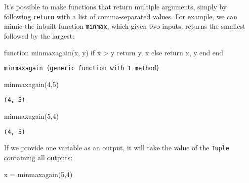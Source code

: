 \documentclass[
  letterpaper,
  DIV=11,
  numbers=noendperiod]{scrreprt}
\newenvironment{Shaded}{\begin{snugshade}}{\end{snugshade}}
\newcommand{\ControlFlowTok}[1]{\textcolor[rgb]{0.00,0.23,0.31}{#1}}
\newcommand{\FloatTok}[1]{\textcolor[rgb]{0.68,0.00,0.00}{#1}}
\newcommand{\FunctionTok}[1]{\textcolor[rgb]{0.28,0.35,0.67}{#1}}
\newcommand{\KeywordTok}[1]{\textcolor[rgb]{0.00,0.23,0.31}{#1}}
\newcommand{\NormalTok}[1]{\textcolor[rgb]{0.00,0.23,0.31}{#1}}
\newcommand{\OperatorTok}[1]{\textcolor[rgb]{0.37,0.37,0.37}{#1}}
\begin{document}
It's possible to make functions that return multiple arguments, simply
by following \texttt{return} with a list of comma-separated values. For
example, we can mimic the inbuilt function \texttt{minmax}, which given
two inputs, returns the smallest followed by the largest:

\begin{Shaded}
\begin{Highlighting}[]
\KeywordTok{function} \FunctionTok{minmaxagain}\NormalTok{(x, y)}
    \ControlFlowTok{if}\NormalTok{ x }\OperatorTok{\textgreater{}}\NormalTok{ y}
        \ControlFlowTok{return}\NormalTok{ y, x}
    \ControlFlowTok{else}
        \ControlFlowTok{return}\NormalTok{ x, y}
    \ControlFlowTok{end}
\KeywordTok{end}
\end{Highlighting}
\end{Shaded}

\begin{verbatim}
minmaxagain (generic function with 1 method)
\end{verbatim}

\begin{Shaded}
\begin{Highlighting}[]
\FunctionTok{minmaxagain}\NormalTok{(}\FloatTok{4}\NormalTok{,}\FloatTok{5}\NormalTok{)}
\end{Highlighting}
\end{Shaded}

\begin{verbatim}
(4, 5)
\end{verbatim}

\begin{Shaded}
\begin{Highlighting}[]
\FunctionTok{minmaxagain}\NormalTok{(}\FloatTok{5}\NormalTok{,}\FloatTok{4}\NormalTok{)}
\end{Highlighting}
\end{Shaded}

\begin{verbatim}
(4, 5)
\end{verbatim}

If we provide one variable as an output, it will take the value of the
\texttt{Tuple} containing all outputs:

\begin{Shaded}
\begin{Highlighting}[]
\NormalTok{x }\OperatorTok{=} \FunctionTok{minmaxagain}\NormalTok{(}\FloatTok{5}\NormalTok{,}\FloatTok{4}\NormalTok{)}
\end{Highlighting}
\end{Shaded}
\end{document}
